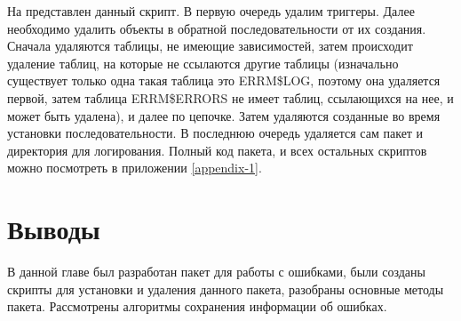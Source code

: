 На  представлен данный скрипт. В первую очередь удалим триггеры. Далее необходимо удалить объекты в обратной последовательности от их создания. Сначала удаляются таблицы, не имеющие зависимостей, затем происходит удаление таблиц, на которые не ссылаются другие таблицы (изначально существует только одна такая таблица это ERRM\$LOG, поэтому она удаляется первой, затем таблица ERRM\$ERRORS не имеет таблиц, ссылающихся на нее, и может быть удалена), и далее по цепочке. Затем удаляются созданные во время установки последовательности. В последнюю очередь удаляется сам пакет и директория для логирования.
Полный код пакета, и всех остальных скриптов можно посмотреть в приложении \ref{appendix-1}. 


\section{Выводы} \label{ch3:conclusion}


В данной главе был разработан пакет для работы с ошибками, были созданы скрипты для установки и удаления данного пакета, разобраны основные методы пакета. Рассмотрены алгоритмы сохранения информации об ошибках. 


%
\newpage %
